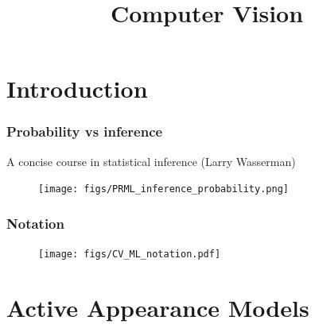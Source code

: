 
\title{Computer Vision}
\begin{frame}\logoTree
	\institute{}
	\titlepage
\end{frame}


\section{Introduction}
\begin{frame}\frametitle{Probability vs inference}\logoEvolution\mypagenum
	A concise course in statistical inference (Larry Wasserman)
	\begin{figure}
		\texttt{[image: figs/PRML\_inference\_probability.png]}
	\end{figure}
\end{frame}

\begin{frame}\frametitle{Notation}\logoEvolution\mypagenum
	\begin{figure}
		\texttt{[image: figs/CV\_ML\_notation.pdf]}
	\end{figure}
\end{frame}



\section{Active Appearance Models}

